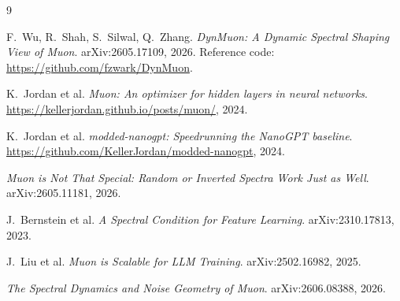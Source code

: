 \documentclass{article}
\begin{document}
\begin{thebibliography}{9}

F.~Wu, R.~Shah, S.~Silwal, Q.~Zhang.
\emph{DynMuon: A Dynamic Spectral Shaping View of Muon}.
arXiv:2605.17109, 2026. Reference code: \url{https://github.com/fzwark/DynMuon}.

K.~Jordan et al.
\emph{Muon: An optimizer for hidden layers in neural networks}.
\url{https://kellerjordan.github.io/posts/muon/}, 2024.

K.~Jordan et al.
\emph{modded-nanogpt: Speedrunning the NanoGPT baseline}.
\url{https://github.com/KellerJordan/modded-nanogpt}, 2024.

\emph{Muon is Not That Special: Random or Inverted Spectra Work Just as
Well}. arXiv:2605.11181, 2026.

J.~Bernstein et al.
\emph{A Spectral Condition for Feature Learning}.
arXiv:2310.17813, 2023.

J.~Liu et al.
\emph{Muon is Scalable for LLM Training}.
arXiv:2502.16982, 2025.

\emph{The Spectral Dynamics and Noise Geometry of Muon}.
arXiv:2606.08388, 2026.

\end{thebibliography}
\end{document}
